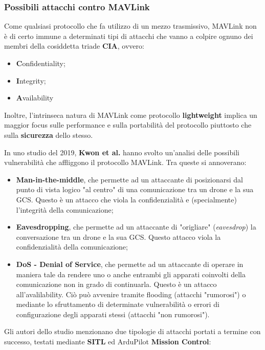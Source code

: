 \documentclass[a4paper, 12pt, oneside]{article}
\begin{document}
\subsubsection{Possibili attacchi contro MAVLink}
Come qualsiasi protocollo che fa utilizzo di un mezzo trasmissivo, MAVLink non è di certo immune a determinati tipi di attacchi che vanno a colpire ognuno dei membri della cosiddetta triade \textbf{CIA}, ovvero:

\begin{itemize}
    \item \textbf{C}onfidentiality;
    \item \textbf{I}ntegrity;
    \item \textbf{A}vailability
\end{itemize}

Inoltre, l'intrinseca natura di MAVLink come protocollo \textbf{lightweight} implica un maggior focus sulle performance e sulla portabilità del protocollo piuttosto che sulla \textbf{sicurezza} dello stesso.

In uno studio \cite{8425627} del 2019, \textbf{Kwon et al.} hanno svolto un'analisi delle possibili vulnerabilità che affliggono il protocollo MAVLink. Tra queste si annoverano:

\begin{itemize}
    \item \textbf{Man-in-the-middle}, che permette ad un attaccante di posizionarsi dal punto di vista logico "al centro" di una comunicazione tra un drone e la sua GCS. Questo è un attacco che viola la confidenzialità e (specialmente) l'integrità della comunicazione;
    \item \textbf{Eavesdropping}, che permette ad un attaccante di "origliare" (\textit{eavesdrop}) la conversazione tra un drone e la sua GCS. Questo attacco viola la confidenzialità della comunicazione;
    \item \textbf{DoS - Denial of Service}, che permette ad un attaccante di operare in maniera tale da rendere uno o anche entrambi gli apparati coinvolti della comunicazione non in grado di continuarla. Questo è un attacco all'avalilability. Ciò può avvenire tramite flooding (attacchi "rumorosi") o mediante lo sfruttamento di determinate vulnerabilità o errori di configurazione degli apparati stessi (attacchi "non rumorosi").
\end{itemize}

Gli autori dello studio menzionano due tipologie di attacchi portati a termine con successo, testati mediante \textbf{SITL} ed ArduPilot \textbf{Mission Control}:
\end{document}
